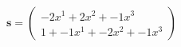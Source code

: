 \documentclass[preview]{standalone}
\begin{document}
\begin{align*}
\mathbf{s} = \begin{pmatrix}-2x^{1} + 2x^{2} + -1x^{3} \\ 1 + -1x^{1} + -2x^{2} + -1x^{3}\end{pmatrix}
\end{align*}
\end{document}
